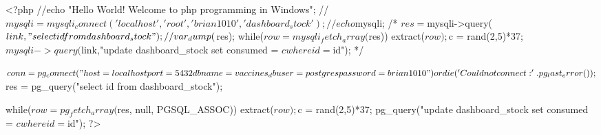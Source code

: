 <?php
//echo "Hello World! Welcome to php programming in Windows";
//$mysqli = mysqli_connect('localhost', 'root', 'brian1010', 'dashboard_stock');
//echo $mysqli;
/*
$res = $mysqli->query($link, "select id from dashboard_stock");
//var_dump($res);
while($row = mysqli_fetch_array($res)){
	extract($row);
	$c = rand(2,5)*37;
	$mysqli->query($link,"update dashboard_stock set consumed = $c where id = $id");
}*/

$conn = pg_connect("host=localhost port=5432 dbname=vaccines_db user=postgres password=brian1010")
		or die('Could not connect: ' . pg_last_error());
		
$res = pg_query("select id from dashboard_stock");

while($row = pg_fetch_array($res, null, PGSQL_ASSOC)){
	extract($row);
	$c = rand(2,5)*37;
	pg_query("update dashboard_stock set consumed = $c where id = $id");
}
?>